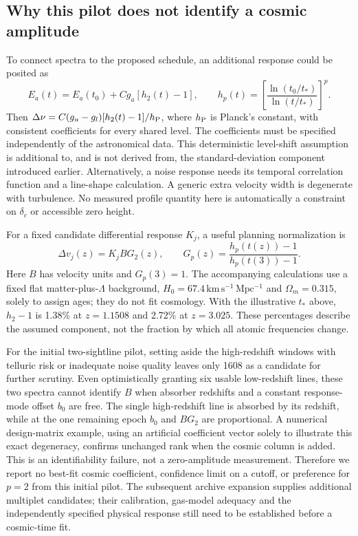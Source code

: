 



\subsection{Why this pilot does not identify a cosmic amplitude}
To connect spectra to the proposed schedule, an additional response could be posited as
\begin{equation}
 E_a(t)=E_a(t_0)+C g_a[h_2(t)-1],\qquad
 h_p(t)=\left[\frac{\ln(t_0/t_*)}{\ln(t/t_*)}\right]^p.
\end{equation}
Then $\Delta\nu=C(g_u-g_l)[h_2(t)-1]/h_{\rm P}$, where $h_{\rm P}$ is Planck's constant, with consistent coefficients for every shared level. The coefficients must be specified independently of the astronomical data. This deterministic level-shift assumption is additional to, and is not derived from, the standard-deviation component introduced earlier. Alternatively, a noise response needs its temporal correlation function and a line-shape calculation. A generic extra velocity width is degenerate with turbulence. No measured profile quantity here is automatically a constraint on $\delta_c$ or accessible zero height.

For a fixed candidate differential response $K_j$, a useful planning normalization is
\begin{equation}
 \Delta v_j(z)=K_jB G_2(z),\qquad
 G_p(z)=\frac{h_p(t(z))-1}{h_p(t(3))-1}.
 \label{eq:highz_response}
\end{equation}
Here $B$ has velocity units and $G_p(3)=1$. The accompanying calculations use a fixed flat matter-plus-$\Lambda$ background, $H_0=67.4\,\mathrm{km\,s^{-1}\,Mpc^{-1}}$ and $\Omega_m=0.315$, solely to assign ages; they do not fit cosmology. With the illustrative $t_*$ above, $h_2-1$ is 1.38\% at $z=1.1508$ and 2.72\% at $z=3.025$. These percentages describe the assumed component, not the fraction by which all atomic frequencies change.

For the initial two-sightline pilot, setting aside the high-redshift windows with telluric risk or inadequate noise quality leaves only 1608 as a candidate for further scrutiny. Even optimistically granting six usable low-redshift lines, these two spectra cannot identify $B$ when absorber redshifts and a constant response-mode offset $b_0$ are free. The single high-redshift line is absorbed by its redshift, while at the one remaining epoch $b_0$ and $B G_2$ are proportional. A numerical design-matrix example, using an artificial coefficient vector solely to illustrate this exact degeneracy, confirms unchanged rank when the cosmic column is added. This is an identifiability failure, not a zero-amplitude measurement. Therefore we report no best-fit cosmic coefficient, confidence limit on a cutoff, or preference for $p=2$ from this initial pilot. The subsequent archive expansion supplies additional multiplet candidates; their calibration, gas-model adequacy and the independently specified physical response still need to be established before a cosmic-time fit.

